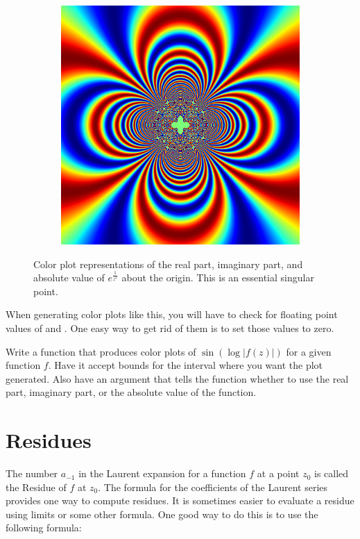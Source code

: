 \begin{figure}
\begin{subfigure}{.32\textwidth}
\end{subfigure}
\begin{subfigure}{.32\textwidth}
\includegraphics[width=\textwidth]{exp_inv2_abs.png}
\end{subfigure}
\caption{Color plot representations of the real part, imaginary part, and absolute value of $e^{\frac{1}{z^2}}$ about the origin.
This is an essential singular point.}
\label{fig:exp_inv2_color}
\end{figure}

\begin{warn}
When generating color plots like this, you will have to check for floating point values of  and .
One easy way to get rid of them is to set those values to zero.
\end{warn}

\begin{problem}
Write a function that produces color plots of $\sin\left(\log\left|f\left(z\right)\right|\right)$ for a given function $f$.
Have it accept bounds for the interval where you want the plot generated.
Also have an argument that tells the function whether to use the real part, imaginary part, or the absolute value of the function.
\end{problem}

\section*{Residues}
The number $a_{-1}$ in the Laurent expansion for a function $f$ at a point $z_0$ is called the Residue of $f$ at $z_0$.
The formula for the coefficients of the Laurent series provides one way to compute residues.
It is sometimes easier to evaluate a residue using limits or some other formula.
One good way to do this is to use the following formula:

